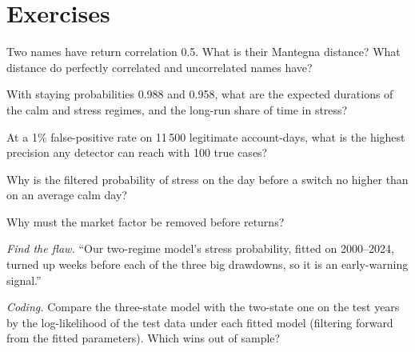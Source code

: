 \section{Exercises}

\begin{exercise}[$\star$]\label{exo:ml:clustering-regimes-and-anomaly-detection:1}
Two names have return correlation 0.5. What is their Mantegna distance? What distance do perfectly correlated and uncorrelated
names have?
\end{exercise}

\begin{exercise}[$\star$]\label{exo:ml:clustering-regimes-and-anomaly-detection:2}
With staying probabilities 0.988 and 0.958, what are the expected durations of the calm and stress regimes, and the long-run
share of time in stress?
\end{exercise}

\begin{exercise}[$\star$]\label{exo:ml:clustering-regimes-and-anomaly-detection:3}
At a 1\% false-positive rate on 11\,500 legitimate account-days, what is the highest precision any detector can reach with 100
true cases?
\end{exercise}

\begin{exercise}[$\star\star$]\label{exo:ml:clustering-regimes-and-anomaly-detection:4}
Why is the filtered probability of stress on the day before a switch no higher than on an average calm day?
\end{exercise}

\begin{exercise}[$\star\star$]\label{exo:ml:clustering-regimes-and-anomaly-detection:5}
Why must the market factor be removed before  returns?
\end{exercise}

\begin{exercise}[$\star\star$]\label{exo:ml:clustering-regimes-and-anomaly-detection:6}
\emph{Find the flaw.} ``Our two-regime model's stress probability, fitted on 2000--2024, turned up weeks before each of the
three big drawdowns, so it is an early-warning signal.''
\end{exercise}

\begin{exercise}[$\star\star\star$]\label{exo:ml:clustering-regimes-and-anomaly-detection:7}
\emph{Coding.} Compare the three-state model with the two-state one on the test years by the log-likelihood of the test data
under each fitted model (filtering forward from the fitted parameters). Which wins out of sample?
\end{exercise}

